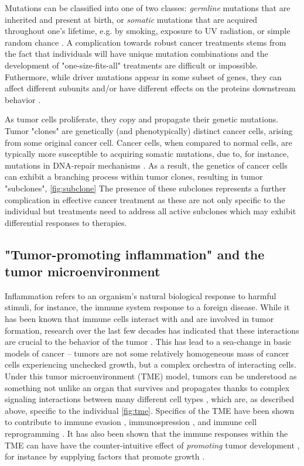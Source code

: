 Mutations can be classified into one of two classes:
\emph{germline} mutations that are inherited and present at birth, or
\emph{somatic} mutations that are acquired throughout one's lifetime, e.g. by smoking, exposure to UV radiation, or simple random chance \cite{griffiths2008}.
A complication towards robust cancer treatments stems from the fact that individuals will have unique mutation combinations and the development of "one-size-fits-all" treatments are difficult or impossible.
Futhermore, while driver mutations appear in some subset of genes, they can affect different subunits and/or have different effects on the proteins downstream behavior \cite{smiech2020}.

As tumor cells proliferate, they copy and propagate their genetic mutations.
Tumor "clones" are genetically (and phenotypically) distinct cancer cells, arising from some original cancer cell.
Cancer cells, when compared to normal cells, are typically more susceptible to acquiring somatic mutations, due to, for instance, mutations in DNA-repair mechanisms \cite{negrini2010,salk2010}.
As a result, the genetics of cancer cells can exhibit a branching process within tumor clones, resulting in tumor "subclones", \ref{fig:subclone}
The presence of these subclones represents a further complication in effective cancer treatment as these are not only specific to the individual but treatments need to address all active subclones which may exhibit differential responses to therapies.

\subsection{"Tumor-promoting inflammation" and the tumor microenvironment}
Inflammation refers to an organism's natural biological response to harmful stimuli,
for instance, the immune system response to a foreign disease.
While it has been known that immune cells interact with and are involved in tumor formation, research over the last few decades has indicated that these interactions are crucial to the behavior of the tumor \cite{grivennikov2010, quail2013}.
This has lead to a sea-change in basic models of cancer -- tumors are not some relatively homogeneous mass of cancer cells experiencing unchecked growth, but a complex orchestra of interacting cells.
Under this tumor microenvironment (TME) model, tumors can be understood as something not unlike an organ that survives and propagates thanks to complex signaling interactions between many different cell types \cite{balkwill2012}, which are, as described above, specific to the individual \ref{fig:tme}.
Specifics of the TME have been shown to contribute to immune evasion \cite{pansy2021},
immunospression \cite{balta2021}, and immune cell reprogramming \cite{cao2022}.
It has also been shown that the immune responses within the TME can have 
have the counter-intuitive effect of \emph{promoting} tumor development \cite{hanahan2011}, for instance by supplying factors that promote growth \cite{denardo2010}.

